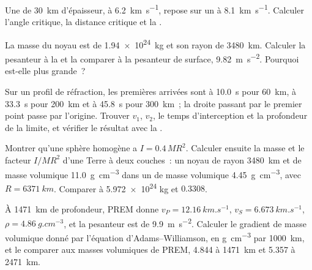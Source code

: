 \begin{exercise}[$\star$]\label{exo:b1:layered-earth:3}
Une  de \qty{30}{km} d'épaisseur, à \qty{6.2}{km.s^{-1}}, repose sur un
 à \qty{8.1}{km.s^{-1}}. Calculer l'angle critique, la distance critique et
la .
\end{exercise}

\begin{exercise}[$\star$]\label{exo:b1:layered-earth:4}
La masse du noyau est de \qty{1.94e24}{kg} et son rayon de \qty{3480}{km}.
Calculer la pesanteur à la  et la comparer à la pesanteur de
surface, \qty{9.82}{m.s^{-2}}. Pourquoi est-elle plus grande~?
\end{exercise}

\begin{exercise}[$\star\star$]\label{exo:b1:layered-earth:5}
Sur un profil de réfraction, les premières arrivées sont à \qty{10.0}{s} pour
\qty{60}{km}, à \qty{33.3}{s} pour \qty{200}{km} et à \qty{45.8}{s} pour
\qty{300}{km}~; la droite passant par le premier point passe par l'origine.
Trouver $v_1$, $v_2$, le temps d'interception et la profondeur de la limite, et
vérifier le résultat avec la .
\end{exercise}

\begin{exercise}[$\star\star$]\label{exo:b1:layered-earth:6}
Montrer qu'une sphère homogène a $I = 0.4\,MR^2$. Calculer ensuite la masse et le
facteur $I/MR^2$ d'une Terre à deux couches~: un noyau de rayon \qty{3480}{km} et
de masse volumique \qty{11.0}{g.cm^{-3}} dans un  de masse volumique
\qty{4.45}{g.cm^{-3}}, avec $R = \qty{6371}{km}$. Comparer à \num{5.972e24} kg et
$0.3308$.
\end{exercise}

\begin{exercise}[$\star\star$]\label{exo:b1:layered-earth:7}
À \qty{1471}{km} de profondeur, PREM donne $v_P = \qty{12.16}{km.s^{-1}}$,
$v_S = \qty{6.673}{km.s^{-1}}$, $\rho = \qty{4.86}{g.cm^{-3}}$, et la pesanteur
est de \qty{9.9}{m.s^{-2}}. Calculer le gradient de masse volumique donné par
l'équation d'Adams--Williamson, en \unit{g.cm^{-3}} par \qty{1000}{km}, et le
comparer aux masses volumiques de PREM, \num{4.844} à \qty{1471}{km} et
\num{5.357} à \qty{2471}{km}.
\end{exercise}

